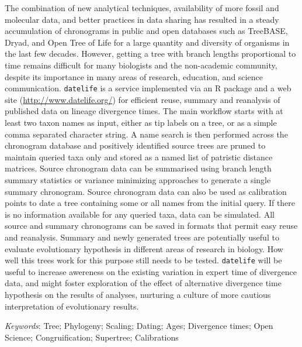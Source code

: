 \documentclass[11pt,]{article}
\renewenvironment{abstract}
 {{%
    \setlength{\leftmargin}{0mm}
    \setlength{\rightmargin}{\leftmargin}%
  }%
  \relax}
 {\endlist}
\begin{document}
\begin{abstract}

    \hbox{\vrule height .2pt width 39.14pc}

    \vskip 8.5pt %

\noindent The combination of new analytical techniques, availability of more
fossil and molecular data, and better practices in data sharing has
resulted in a steady accumulation of chronograms in public and open
databases such as TreeBASE, Dryad, and Open Tree of Life for a large
quantity and diversity of organisms in the last few decades. However,
getting a tree with branch lengths proportional to time remains
difficult for many biologists and the non-academic community, despite
its importance in many areas of research, education, and science
communication. \texttt{datelife} is a service implemented via an R
package and a web site (\url{http://www.datelife.org/}) for efficient
reuse, summary and reanalysis of published data on lineage divergence
times. The main workflow starts with at least two taxon names as input,
either as tip labels on a tree, or as a simple comma separated character
string. A name search is then performed across the chronogram database
and positively identified source trees are pruned to maintain queried
taxa only and stored as a named list of patristic distance matrices.
Source chronogram data can be summarised using branch length summary
statistics or variance minimizing approaches to generate a single
summary chronogram. Source chronogram data can also be used as
calibration points to date a tree containing some or all names from the
initial query. If there is no information available for any queried
taxa, data can be simulated. All source and summary chronograms can be
saved in formats that permit easy reuse and reanalysis. Summary and
newly generated trees are potentially useful to evaluate evolutionary
hypothesis in different areas of research in biology. How well this
trees work for this purpose still needs to be tested. \texttt{datelife}
will be useful to increase awereness on the existing variation in expert
time of divergence data, and might foster exploration of the effect of
alternative divergence time hypothesis on the results of analyses,
nurturing a culture of more cautious interpretation of evolutionary
results.


\vskip 8.5pt \noindent \emph{Keywords}: Tree; Phylogeny; Scaling; Dating; Ages; Divergence times; Open Science;
Congruification; Supertree; Calibrations \par

    \hbox{\vrule height .2pt width 39.14pc}



\end{abstract}
\end{document}

